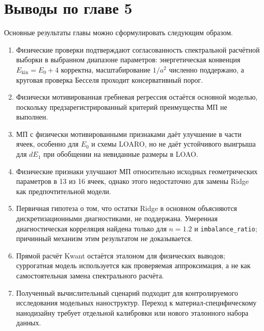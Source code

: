 \section{Выводы по главе 5}

Основные результаты главы можно сформулировать следующим образом.

\begin{enumerate}
  \item Физические проверки подтверждают согласованность спектральной расчётной выборки в
  выбранном диапазоне параметров: энергетическая конвенция $E_{\mathrm{kin}}=E_0+4$
  корректна, масштабирование $1/a^2$ численно поддержано, а круговая проверка Бесселя
  проходит консервативный порог.
  \item Физически мотивированная гребневая регрессия остаётся основной моделью, поскольку
  предзарегистрированный критерий преимущества МП не выполнен.
  \item МП с физически мотивированными признаками даёт улучшение в части ячеек, особенно
  для $E_0$ и схемы LOARO, но не даёт устойчивого выигрыша для $dE_1$ при обобщении на
  невиданные размеры в LOAO.
  \item Физические признаки улучшают МП относительно исходных геометрических параметров в
  13 из 16 ячеек, однако этого недостаточно для замены Ridge как предпочтительной модели.
  \item Первичная гипотеза о том, что остатки Ridge в основном объясняются
  дискретизационными диагностиками, не поддержана. Умеренная диагностическая корреляция
  найдена только для $n=1.2$ и \texttt{imbalance\_ratio}; причинный механизм этим
  результатом не доказывается.
  \item Прямой расчёт Kwant остаётся эталоном для физических выводов; суррогатная модель
  используется как проверяемая аппроксимация, а не как самостоятельная замена
  спектрального расчёта.
  \item Полученный вычислительный сценарий подходит для контролируемого исследования
  модельных наноструктур. Переход к материал-специфическому нанодизайну требует отдельной
  калибровки или нового эталонного набора данных.
\end{enumerate}

\clearpage
